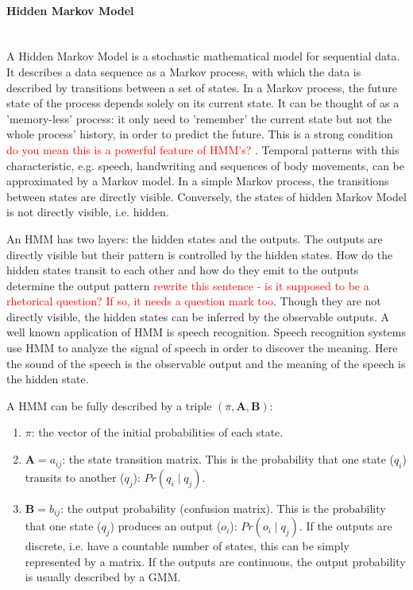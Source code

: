 \paragraph{Hidden Markov Model} ~\\
A Hidden Markov Model is a stochastic mathematical model for sequential data. It describes a data sequence as a Markov process, with which the data is described by transitions between a set of states. In a Markov process, the future state of the process depends solely on its current state. It can be thought of as a 'memory-less' process: it only need to 'remember' the current state but not the whole process' history, in order to predict the future. This is a strong condition
\textcolor{red}{do you mean this is a powerful feature of HMM's? }.
Temporal patterns with this characteristic, e.g. speech, handwriting and sequences of body movements, can be approximated by a Markov model. In a simple Markov process, the transitions between states are directly visible. Conversely, the states of hidden Markov Model is not directly visible, i.e. hidden.

An HMM has two layers: the hidden states and the outputs. The outputs are directly visible but their pattern is controlled by the hidden states. How do the hidden states transit to each other and how do they emit to the outputs determine the output pattern
\textcolor{red}{rewrite this sentence - is it supposed to be a rhetorical question? If so, it needs a question mark too}. Though they are not directly visible, the hidden states can be inferred by the observable outputs. A well known application of HMM is speech recognition. Speech recognition systems use HMM to analyze the signal of speech in order to discover the meaning. Here the sound of the speech is the observable output and the meaning of the speech is the hidden state.


A HMM can be fully described by a triple $\left(\pi,\boldsymbol{A},\boldsymbol{B}\right)$:

\begin{enumerate}
\item $\pi$: the vector of the initial probabilities of each state.
\item $\boldsymbol{A}={a_{ij}}$: the state transition matrix. This is the probability that one state ($q_i$) transits to another ($q_j$): $Pr\left(q_i{\mid}q_j\right)$.
\item $\boldsymbol{B}={b_{ij}}$: the output probability (confusion matrix). This is the probability that one state ($q_j$) produces an output ($o_i$): $Pr\left(o_i{\mid}q_{j}\right)$. If the outputs are discrete, i.e. have a countable number of states, this can be simply represented by a matrix. If the outputs are continuous, the output probability is usually described by a GMM.
\end{enumerate}

